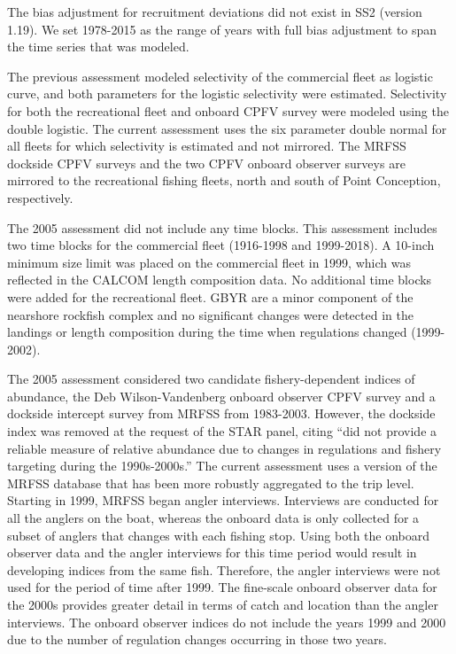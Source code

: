 \documentclass[12pt,]{article}
\begin{document}
The bias adjustment for recruitment deviations did not exist in SS2
(version 1.19). We set 1978-2015 as the range of years with full bias
adjustment to span the time series that was modeled.

The previous assessment modeled selectivity of the commercial fleet as
logistic curve, and both parameters for the logistic selectivity were
estimated. Selectivity for both the recreational fleet and onboard CPFV
survey were modeled using the double logistic. The current assessment
uses the six parameter double normal for all fleets for which
selectivity is estimated and not mirrored. The MRFSS dockside CPFV
surveys and the two CPFV onboard observer surveys are mirrored to the
recreational fishing fleets, north and south of Point Conception,
respectively.

The 2005 assessment did not include any time blocks. This assessment
includes two time blocks for the commercial fleet (1916-1998 and
1999-2018). A 10-inch minimum size limit was placed on the commercial
fleet in 1999, which was reflected in the CALCOM length composition
data. No additional time blocks were added for the recreational fleet.
GBYR are a minor component of the nearshore rockfish complex and no
significant changes were detected in the landings or length composition
during the time when regulations changed (1999-2002).

The 2005 assessment considered two candidate fishery-dependent indices
of abundance, the Deb Wilson-Vandenberg onboard observer CPFV survey and
a dockside intercept survey from MRFSS from 1983-2003. However, the
dockside index was removed at the request of the STAR panel, citing
``did not provide a reliable measure of relative abundance due to
changes in regulations and fishery targeting during the 1990s-2000s.''
The current assessment uses a version of the MRFSS database that has
been more robustly aggregated to the trip level. Starting in 1999, MRFSS
began angler interviews. Interviews are conducted for all the anglers on
the boat, whereas the onboard data is only collected for a subset of
anglers that changes with each fishing stop. Using both the onboard
observer data and the angler interviews for this time period would
result in developing indices from the same fish. Therefore, the angler
interviews were not used for the period of time after 1999. The
fine-scale onboard observer data for the 2000s provides greater detail
in terms of catch and location than the angler interviews. The onboard
observer indices do not include the years 1999 and 2000 due to the
number of regulation changes occurring in those two years.
\end{document}

